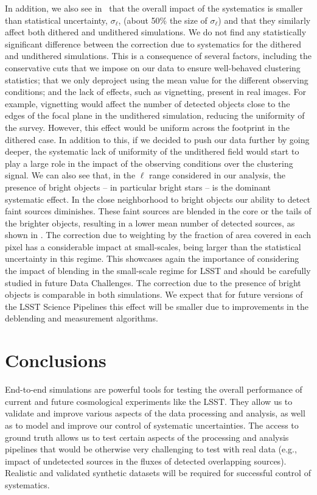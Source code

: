 \documentclass[\docopts]{\docclass}
\begin{document}
In addition, we also see in~ that the overall impact of the systematics is smaller than statistical uncertainty, $\sigma_{\ell}$, (about 50\% the size of $\sigma_{\ell}$) and that they similarly affect both dithered and undithered simulations. We do not find any statistically significant difference between the correction due to systematics for the dithered and undithered simulations. This is a consequence of several factors, including the conservative cuts that we impose on our data to ensure well-behaved clustering statistics; that we only deproject using the mean value for the different observing conditions; and the lack of effects, such as vignetting, present in real images. For example, vignetting would affect the number of detected objects close to the edges of the focal plane in the undithered simulation, reducing the uniformity of the survey. However, this effect would be uniform across the footprint in the dithered case. In addition to this, if we decided to push our data further by going deeper, the systematic lack of uniformity of the undithered field would start to play a large role in the impact of the observing conditions over the clustering signal. We can also see that, in the $\ell$ range considered in our analysis, the presence of bright objects -- in particular bright stars -- is the dominant systematic effect. In the close neighborhood to bright objects our ability to detect faint sources diminishes. These faint sources are blended in the core or the tails of the brighter objects, resulting in a lower mean number of detected sources, as shown in . The correction due to weighting by the fraction of area covered in each pixel has a considerable impact at small-scales, being larger than the statistical uncertainty in this regime. This showcases again the importance of considering the impact of blending in the small-scale regime for LSST and should be carefully studied in future Data Challenges. The correction due to the presence of bright objects is comparable in both simulations. We expect that for future versions of the LSST Science Pipelines this effect will be smaller due to improvements in the deblending and measurement algorithms.


\section{Conclusions}
\label{sec:conclusions}

End-to-end simulations are powerful tools for testing the overall performance of current and future cosmological experiments like the LSST. They allow us to validate and improve various aspects of the data processing and analysis, as well as to model and improve our control of systematic uncertainties. The access to ground truth allows us to test certain aspects of the processing and analysis pipelines that would be otherwise very challenging to test with real data (e.g., impact of undetected sources in the fluxes of detected overlapping sources). Realistic and validated synthetic datasets will be required for successful control of systematics.
\end{document}
